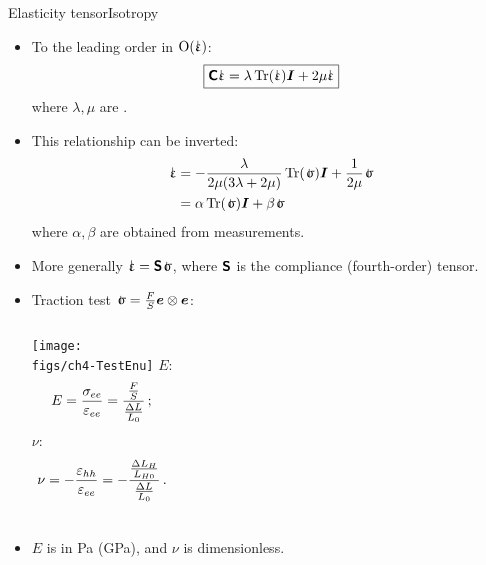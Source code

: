 \begin{frame}{Elasticity tensor}{Isotropy}

\begin{overprint}

\begin{itemize}
\item To the leading order in $\text{O}(\strain)$:
\begin{displaymath}
\boxed{\tenselas\strain=\lambda\trace(\strain)\Id+2\mu\strain}
\end{displaymath}
where $\lambda,\mu$ are .
\item This relationship can be inverted:
\begin{displaymath}
\begin{split}
\strain &=-\frac{\lambda}{2\mu(3\lambda+2\mu)}\trace(\stress)\Id+\frac{1}{2\mu}\stress \\
&=\alpha\trace(\stress)\Id+\beta\stress \\
\end{split}
\end{displaymath}
where $\alpha,\beta$ are obtained from measurements.
\item More generally $\strain=\tenscomp\stress$, where $\boldsymbol{\mathsf{\Large S}}$ is the compliance (fourth-order) tensor.
\end{itemize}

\begin{itemize}
\item Traction test $\stress=\frac{F}{S}\ev\otimes\ev$:
\begin{columns}[t]
\hspace*{-0.3truecm}\centering\texttt{[image: \\figs/ch4-TestEnu]}
\vskip-140pt
 $E$: 
\begin{displaymath}
E=\frac{\sigma_{ee}}{\varepsilon_{ee}}=\frac{\frac{F}{S}}{\frac{\Delta L}{L_0}}\,;
\end{displaymath}
 $\nu$:
\begin{displaymath}
\nu=-\frac{\varepsilon_{hh}}{\varepsilon_{ee}}=-\frac{\frac{\Delta L_H}{L_{H0}}}{\frac{\Delta L}{L_0}}\,.
\end{displaymath}
\end{columns}
\item $E$ is in Pa (GPa), and $\nu$ is dimensionless.
\end{itemize}


\end{overprint}
\end{frame}
